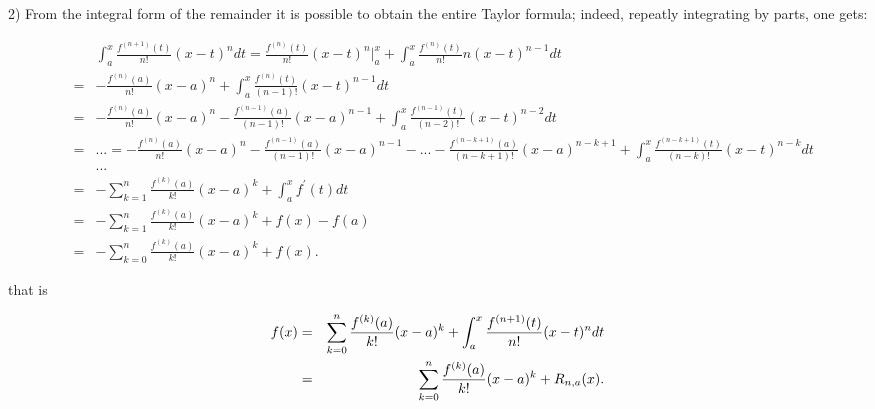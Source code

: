\documentclass[12pt]{article}
\begin{document}
2) From the integral form of the remainder it is possible to obtain the
entire Taylor formula; indeed, repeatly integrating by parts, one gets:

\begin{eqnarray*}
&&\int_{a}^{x}\frac{f^{(n+1)}(t)}{n!}(x-t)^{n}dt=\frac{f^{(n)}(t)}{n!}%
(x-t)^{n}|_{a}^{x}+\int_{a}^{x}\frac{f^{(n)}(t)}{n!}n(x-t)^{n-1}dt \\
&=&-\frac{f^{(n)}(a)}{n!}(x-a)^{n}+\int_{a}^{x}\frac{f^{(n)}(t)}{(n-1)!}%
(x-t)^{n-1}dt \\
&=&-\frac{f^{(n)}(a)}{n!}(x-a)^{n}-\frac{f^{(n-1)}(a)}{(n-1)!}%
(x-a)^{n-1}+\int_{a}^{x}\frac{f^{(n-1)}(t)}{(n-2)!}(x-t)^{n-2}dt \\
&=&...=-\frac{f^{(n)}(a)}{n!}(x-a)^{n}-\frac{f^{(n-1)}(a)}{(n-1)!}%
(x-a)^{n-1}-...-\frac{f^{(n-k+1)}(a)}{(n-k+1)!}(x-a)^{n-k+1}+\int_{a}^{x}%
\frac{f^{(n-k+1)}(t)}{(n-k)!}(x-t)^{n-k}dt \\
&&... \\
&=&-\sum_{k=1}^{n}\frac{f^{(k)}(a)}{k!}(x-a)^{k}+\int_{a}^{x}f^{\prime }(t)dt
\\
&=&-\sum_{k=1}^{n}\frac{f^{(k)}(a)}{k!}(x-a)^{k}+f(x)-f(a) \\
&=&-\sum_{k=0}^{n}\frac{f^{(k)}(a)}{k!}(x-a)^{k}+f(x).
\end{eqnarray*}

that is

\begin{eqnarray*}
f(x) &=&\sum_{k=0}^{n}\frac{f^{(k)}(a)}{k!}(x-a)^{k}+\int_{a}^{x}\frac{%
f^{(n+1)}(t)}{n!}(x-t)^{n}dt \\
&=&\sum_{k=0}^{n}\frac{f^{(k)}(a)}{k!}(x-a)^{k}+R_{n,a}(x).
\end{eqnarray*}
\end{document}
